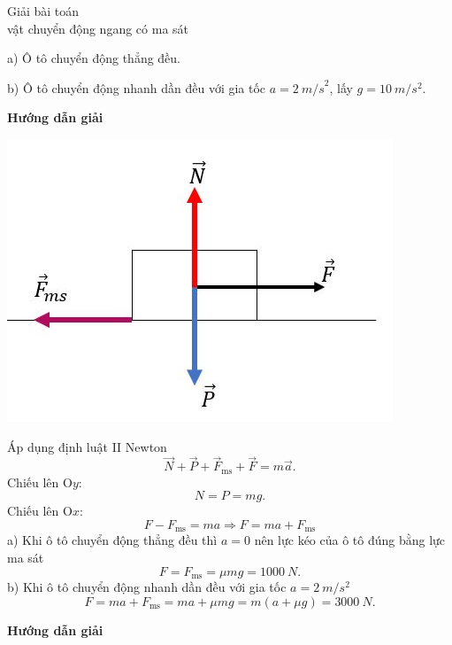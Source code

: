 \begin{dang}{Giải bài toán\\ vật chuyển động ngang có ma sát}
{		a) Ô tô chuyển động thẳng đều.
		
		b) Ô tô chuyển động nhanh dần đều với gia tốc $a = \SI{2}{m/s}^2$, lấy $g=\SI{10}{m/s^2}$.
	}
	{	\begin{center}
			\textbf{Hướng dẫn giải}
		\end{center}
		\begin{center}
			\includegraphics[scale=0.6]{../figs/VN10-PH-15-A-005-3-V2-03.JPG}
		\end{center} 
		Áp dụng định luật II Newton
			\begin{equation*}
				\vec{N}+\vec{P} + \vec{F}_{\text{ms}} + \vec{F} = m\vec{a}.
			\end{equation*}
		Chiếu lên O$y$:
			\begin{equation*}
				N=P = mg.
			\end{equation*}
		Chiếu lên O$x$:
			\begin{equation*}
				F-F_{\text{ms}} = ma \Rightarrow F = ma + F_{\text{ms}}
			\end{equation*}
		a) Khi ô tô chuyển động thẳng đều thì $a=0$ nên lực kéo của ô tô đúng bằng lực ma sát
		\begin{equation*}
			F=F_{\text{ms}} = \mu mg = \SI{1000}{N}.
		\end{equation*}
		b) Khi ô tô chuyển động nhanh dần đều với gia tốc $a = \SI{2}{m/s^2}$ 
		\begin{equation*}
			F= ma + F_{\text{ms}} = ma + \mu mg = m(a+ \mu g) = \SI{3000}{N}.
		\end{equation*}
		
	}
	
	{	\begin{center}
			\textbf{Hướng dẫn giải}
		\end{center}
		
}
\end{dang}

